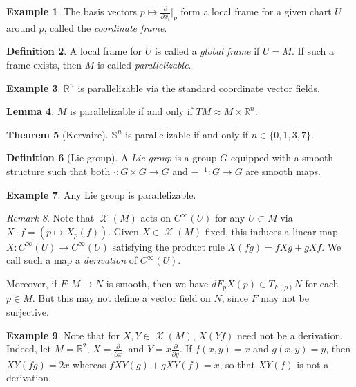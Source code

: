 \documentclass[10pt,letterpaper,cm]{nupset}
\theoremstyle{definition}
\newtheorem{definition}{Definition}[subsection]
\newtheorem{exmp}[definition]{Example}
\theoremstyle{theorem}
\newtheorem{theorem}[definition]{Theorem}
\newtheorem{lemma}[definition]{Lemma}
\theoremstyle{remark}
\newtheorem{remark}[definition]{Remark}
\newcommand{\R}{\mathbb R}
\renewcommand{\S}{\mathbb S}
\newcommand{\1}{\mathbf{1}}
\newcommand{\0}{\vec 0}
\DeclareMathOperator{\vf}{\mathscr{X}}
\begin{document}
\begin{exmp}
The basis vectors $p\mapsto \frac{\partial}{\partial{x_i}}\bigr\rvert_p$ form a local frame for a given chart $U$ around $p$, called the \textit{coordinate frame}.
\end{exmp}

\begin{definition}
A  local frame for $U$ is called a \textit{global frame} if $U =M$. If such a frame exists, then $M$ is called \textit{parallelizable}.
\end{definition}

\begin{exmp}
$\R^n$ is parallelizable via the standard coordinate vector fields.
\end{exmp}

\begin{lemma}
$M$ is parallelizable if and only if $TM \approx M \times \R^n$.
\end{lemma}

\begin{theorem}[Kervaire]
$\S^n$ is parallelizable if and only if $n\in \{0, 1, 3, 7\}$.
\end{theorem}

\begin{definition}[Lie group]
A  \textit{Lie group} is a group $G$ equipped with a smooth structure such that both $\cdot : G \times G \to G$ and ${-}^{-1} : G \to G$ are smooth maps.
\end{definition}

\begin{exmp}
Any Lie group is parallelizable. 
\end{exmp}

\begin{remark}
Note that $\vf(M)$ acts on $C^{\infty}(U)$ for any $U \subset M$ via $X \cdot f = (p \mapsto X_p(f))$. Given $X \in \vf(M)$ fixed, this induces a linear map $X : C^{\infty}(U) \to C^{\infty}(U)$ satisfying the product rule $X(fg) = fXg  + gXf$. We call such a map a \textit{derivation} of $C^{\infty}(U)$.

\medskip

 Moreover, if $F: M \to N$ is smooth, then we have $dF_pX(p) \in T_{F(p)}N$ for each $p \in M$. But this may not define a vector field on $N$, since $F$ may not be surjective.
\end{remark}

\begin{exmp}
Note that for $X, Y \in \vf(M)$, $X(Yf)$ need not be a derivation. Indeed, let $M= \R^2$, $X= \frac{\partial}{\partial{x}}$, and $Y = x \frac{\partial}{\partial{y}}$. If $f(x,y)=x$ and $g(x, y) = y$, then $XY(fg) = 2x$ whereas $fXY(g) + gXY(f) = x$, so that $XY(f)$ is not a derivation.
\end{exmp}
\end{document}
